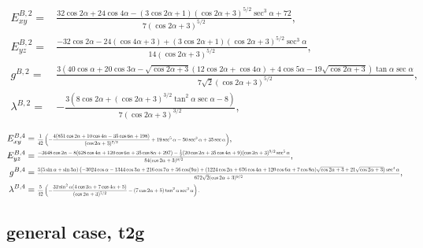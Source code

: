 \documentclass[a4paper,prb]{revtex4-1}  %
\newcommand\scalemath[2]{\scalebox{#1}{\mbox{\ensuremath{\displaystyle #2}}}}
\begin{document}
{%
\begin{align}
E_{xy}^{B,2} =& \frac{32 \cos 2 \alpha +24 \cos 4 \alpha -(3 \cos 2 \alpha +1) (\cos 2 \alpha +3)^{5/2} \sec ^3\alpha +72}{7 (\cos 2 \alpha +3)^{5/2}},\\
E_{yz}^{B,2} =&\frac{-32 \cos 2 \alpha -24 (\cos 4 \alpha +3)+(3 \cos 2 \alpha +1) (\cos 2 \alpha +3)^{5/2} \sec ^3\alpha }{14 (\cos 2 \alpha +3)^{5/2}},\\
g^{B,2} =&\frac{3 \left(40 \cos \alpha +20 \cos 3 \alpha -\sqrt{\cos 2 \alpha +3} (12 \cos 2 \alpha +\cos 4 \alpha )+4 \cos 5 \alpha -19 \sqrt{\cos 2 \alpha +3}\right) \tan \alpha  \sec \alpha }{7 \sqrt{2} (\cos 2 \alpha +3)^{5/2}},\\
\lambda^{B,2} =&-\frac{3 \left(8 \cos 2 \alpha +(\cos 2 \alpha +3)^{3/2} \tan ^2\alpha  \sec \alpha -8\right)}{7 (\cos 2 \alpha +3)^{3/2}},
\end{align}



\begin{align}
E_{xy}^{B,4} &= \scalemath{0.6}{\frac{1}{42} \left(-\frac{4 (851 \cos 2 \alpha +10 \cos 4 \alpha -35 \cos 6 \alpha +198)}{(\cos 2 \alpha +3)^{7/2}}+19 \sec ^5\alpha -50 \sec ^3\alpha +35 \sec \alpha \right)},\\
E_{yz}^{B,4} &= \scalemath{0.6}{\frac{-3648 \cos 2 \alpha -8 (628 \cos 4 \alpha +120 \cos 6 \alpha +35 \cos 8 \alpha +297)-\frac{1}{2} (20 \cos 2 \alpha +35 \cos 4 \alpha +9) (\cos 2 \alpha +3)^{9/2} \sec ^5\alpha }{84 (\cos 2 \alpha +3)^{9/2}}},\\
g^{B,4} &= \scalemath{0.6}{\frac{5 (5 \sin \alpha +\sin 3 \alpha ) \left(-3024 \cos \alpha -1344 \cos 3 \alpha +216 \cos 7 \alpha +56 \cos (9 \alpha )+(1224 \cos 2 \alpha +676 \cos 4 \alpha +120 \cos 6 \alpha +7 \cos 8 \alpha ) \sqrt{\cos 2 \alpha +3}+21 \sqrt{\cos 2 \alpha +3}\right) \sec ^4\alpha }{672 \sqrt{2} (\cos 2 \alpha +3)^{9/2}}},\\
\lambda^{B,4} &= \scalemath{0.6}{\frac{5}{42} \left(-\frac{32 \sin ^2\alpha  (4 \cos 2 \alpha +7 \cos 4 \alpha +5)}{(\cos 2 \alpha +3)^{7/2}}-(7 \cos 2 \alpha +5) \tan ^2\alpha  \sec ^3\alpha \right).}
\end{align}




\subsection{general case, t2g}

}
\end{document}
